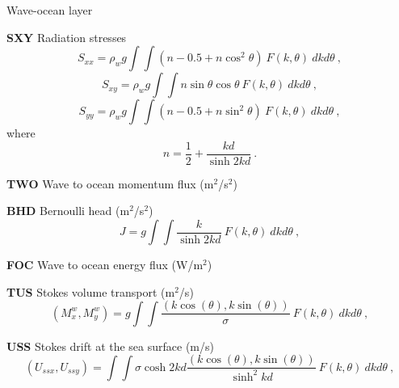 \begin{list}{)\hfill}
\item{Wave-ocean layer}

\begin{list}{)\hfill}
            { \leftmargin 8mm 
             \rightmargin 0mm \itemsep 0mm \parsep 0mm}
\item \textbf{SXY} Radiation stresses
      \begin{equation} S_{xx} = \rho_w g \int \!\!\!\! \int \left
        ( n - 0.5 + n \cos^2 \theta \right )  \: F(k,\theta) \: dk d\theta
      \: , \label{eq:Sxx} \end{equation}
      \begin{equation} S_{xy} =\rho_w g \int \!\!\!\! \int
        n \sin \theta \cos \theta  \: F(k,\theta) \: dk d\theta
      \: , \label{eq:Syy} \end{equation}
      \begin{equation} S_{yy} =\rho_w g \int \!\!\!\! \int \left
        ( n - 0.5 + n \sin^2 \theta \right )  \: F(k,\theta) \: dk d\theta
      \: , \label{eq:Sxy} \end{equation}
      where
      \begin{equation} n = \frac{1}{2} + \frac{kd}{\sinh 2kd}
      \: . \label{eq:n} \end{equation}
\item \textbf{TWO} Wave to ocean momentum flux (m$^2$/s$^2$)
\item \textbf{BHD} Bernoulli head (m$^2$/s$^2$)
      \begin{equation} J =  g \int \!\!\!\! \int  \frac{k}
        {\sinh 2kd}  \: F(k,\theta) \: dk d\theta
      \: , \label{eq:BHD} \end{equation}
\item \textbf{FOC} Wave to ocean energy flux (W/m$^2$)
\item \textbf{TUS} Stokes volume transport (m$^2$/s)
     \begin{equation} (M^w_x,M^w_y) =  g \int \!\!\!\! \int  \frac{(k \cos(\theta),k \sin(\theta))}
        {\sigma}  \: F(k,\theta) \: dk d\theta
      \: , \label{eq:Mw} \end{equation}
\item \textbf{USS} Stokes drift at the sea surface (m/s)
     \begin{equation} (U_{ssx},U_{ssy}) =  \int \!\!\!\! \int  \sigma \cosh 2kd \frac{(k \cos(\theta),k \sin(\theta))}
        {\sinh^2 kd}  \: F(k,\theta) \: dk d\theta
      \: , \label{eq:Uss} \end{equation}

\end{list}
\end{list}
